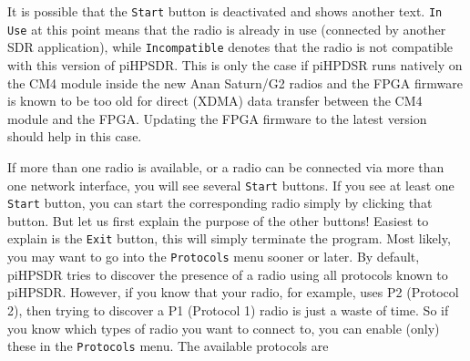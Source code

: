 \documentclass[12pt]{book}
\def\rett#1{\texttt{\color{red}#1}}
\begin{document}
It is possible that the \rett{Start} button is deactivated and shows another text. \rett{In Use} at
this point means that the radio is already in use (connected by another SDR application), while
\rett{Incompatible} denotes that the radio is not compatible with this version of piHPSDR. This
is only the case if piHPDSR runs natively on the CM4 module inside the new Anan Saturn/G2
radios and the FPGA firmware is known to be too old for direct (XDMA) data transfer between the CM4
module and the FPGA. Updating the FPGA firmware to the latest version
should help in this case.

If more than one radio is available, or a radio can be connected via more than one network interface,
you will see several \rett{Start} buttons.
If you see at least one \rett{Start} button, you can start the corresponding radio simply
by clicking that button. But let us first explain the
purpose of the other buttons! Easiest to explain is the \rett{Exit} button, this will simply terminate
the program. Most likely, you may want to go into the \rett{Protocols} menu sooner or later.
By default, piHPSDR tries to discover the presence of a radio using all protocols known to piHPSDR. However,
if you know that your radio, for example, uses P2 (Protocol 2), then trying to discover a P1 (Protocol 1)
radio is just a waste of time. So if you know which types of radio you want to connect to, you can enable
(only) these in the \rett{Protocols} menu. The available protocols are
\end{document}

